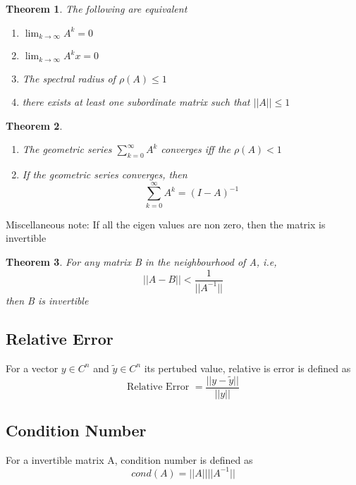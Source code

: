 \documentclass{article}
\newtheorem*{theorem}{Theorem}
\begin{document}
	\begin{theorem}
		The following are equivalent
		\begin{enumerate}
			\item $\lim_{k\rightarrow \infty} A^k = 0$
			\item $\lim_{k\rightarrow \infty} A^kx = 0$
			\item The spectral radius of $\rho(A) \leq 1$
			\item there exists at least one subordinate matrix such that $||A|| \leq 1$
		\end{enumerate}
	\end{theorem}

	\begin{theorem}
		\begin{enumerate}
		\item The geometric series $\sum_{k=0}^\infty A^k$ converges iff the $\rho(A)<1$
		\item If the geometric series converges, then 
			\[\sum_{k=0}^\infty A^k = (I-A)^{-1}\]
		\end{enumerate}
	\end{theorem}

	Miscellaneous note: If all the eigen values are non zero, then the matrix is invertible

	\begin{theorem}
		\item For any matrix B in the neighbourhood of A, i.e,
			\[||A-B|| < \frac{1}{||A^{-1}||}\]
		then B is invertible
	\end{theorem}

	\subsection{Relative Error}
	For a vector $y \in C^n$ and $\tilde{y}\in C^n$ its pertubed value, relative is error is defined as
		\[\text{Relative Error } = \frac{||y-\tilde{y}||}{||y||}\]

	\subsection{Condition Number}
	For a invertible matrix A, condition number is defined as
		\[cond(A) = ||A|| ||A^{-1}||\]
\end{document}
